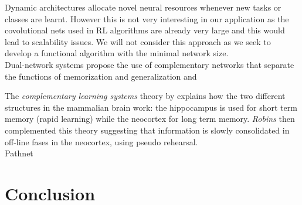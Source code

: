 \documentclass{article}
\begin{document}
\newline
Dynamic architectures allocate novel neural resources whenever  new tasks or classes are learnt. However this is not very interesting in our application as the covolutional nets used in RL algorithms are already very large and this would lead to scalability issues. We will not consider this approach as we seek to develop a functional algorithm with the minimal network size.\\
\newline
Dual-network systems propose the use of complementary networks that separate the functions of memorization and generalization and 















The \textit{complementary learning systems} theory by \citep{McClelland1995WhyMemory.} explains how the two different structures in the mammalian brain work: the hippocampus is used for short term memory (rapid learning) while the neocortex for long term memory. \textit{Robins} then complemented this theory suggesting that information is slowly consolidated in off-line fases in the neocortex, using pseudo rehearsal. \\

Pathnet\\




\section{Conclusion}















\newpage
\end{document}
